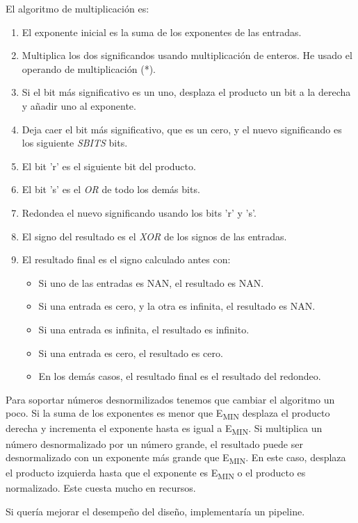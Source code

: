 \documentclass[a4paper]{article}
\begin{document}
El algoritmo de multiplicación es:
\begin{enumerate}[noitemsep]
\item El exponente inicial es la suma de los exponentes de las entradas.
\item Multiplica los dos significandos usando multiplicación de enteros. He usado el operando de multiplicación (*).
\item Si el bit más significativo es un uno, desplaza el producto un bit a la derecha y añadir uno al exponente.
\item Deja caer el bit más significativo, que es un cero, y el nuevo significando es los siguiente \textit{SBITS} bits.
\item El bit 'r' es el siguiente bit del producto.
\item El bit 's' es el \textit{OR} de todo los demás bits.
\item Redondea el nuevo significando usando los bits 'r' y 's'.
\item El signo del resultado es el \textit{XOR} de los signos de las entradas.
\item El resultado final es el signo calculado antes con:
\begin{itemize}[noitemsep]
\item Si uno de las entradas es NAN, el resultado es NAN.
\item Si una entrada es cero, y la otra es infinita, el resultado es NAN.
\item Si una entrada es infinita, el resultado es infinito.
\item Si una entrada es cero, el resultado es cero.
\item En los demás casos, el resultado final es el resultado del redondeo.
\end{itemize}
\end{enumerate}

Para soportar números desnormilizados tenemos que cambiar el algoritmo un poco. Si la suma de los exponentes es menor que E\textsubscript{MIN} desplaza el producto derecha y incrementa el exponente hasta es igual a E\textsubscript{MIN}. Si multiplica un número desnormalizado por un número grande, el resultado puede ser desnormalizado con un exponente más grande que E\textsubscript{MIN}. En este caso, desplaza el producto izquierda hasta que el exponente es E\textsubscript{MIN} o el producto es normalizado. Este cuesta mucho en recursos.

Si quería mejorar el desempeño del diseño, implementaría un pipeline.
\end{document}

